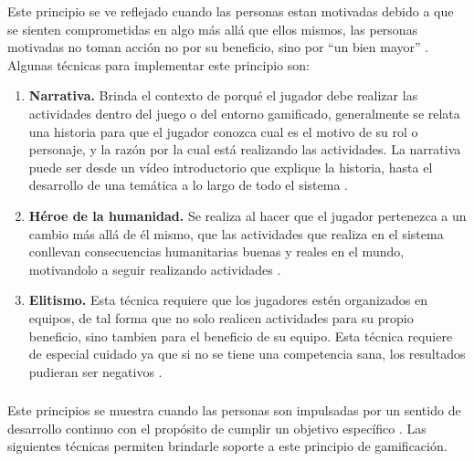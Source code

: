  Este principio se ve reflejado cuando las personas estan motivadas debido a que se
 sienten comprometidas en algo más allá que ellos mismos, las personas motivadas no toman acción
 no por su beneficio, sino por ``un bien mayor'' \cite[p. 66, 69]{Octalysis}. Algunas técnicas
 para implementar este principio son:
    
    \begin{enumerate}
    \item
    {\bf Narrativa.}
        Brinda el contexto de porqué el jugador debe realizar las actividades dentro del juego o
        del entorno gamificado, generalmente se relata una historia para que el jugador conozca
        cual es el motivo de su rol o personaje, y la razón por la cual está realizando las
        actividades. La narrativa puede ser desde un vídeo introductorio que explique la
        historia, hasta el desarrollo de una temática a lo largo de todo el sistema
        \cite[p. 81]{Octalysis}.
        
    \item
    {\bf Héroe de la humanidad.}
        Se realiza al hacer que el jugador pertenezca a un cambio más allá de él mismo, que las
        actividades que realiza en el sistema conllevan consecuencias humanitarias buenas y reales
        en el mundo, motivandolo a seguir realizando actividades \cite[p. 82]{Octalysis}.
        
    \item
    {\bf Elitismo.}
        Esta técnica requiere que los jugadores estén organizados en equipos, de tal forma que
        no solo realicen actividades para su propio beneficio, sino tambien para el beneficio
        de su equipo. Esta técnica requiere de especial cuidado ya que si no se tiene una competencia
        sana, los resultados pudieran ser negativos \cite[p. 83]{Octalysis}.
    
    \end{enumerate}
    
\subsubsection{\principioII} \label{subsec:principioII}
 
 Este principios se muestra cuando las personas son impulsadas por un sentido de desarrollo continuo
 con el propósito de cumplir un objetivo específico \cite[p. 91]{Octalysis}. Las siguientes técnicas
 permiten brindarle soporte a este principio de gamificación.
    
